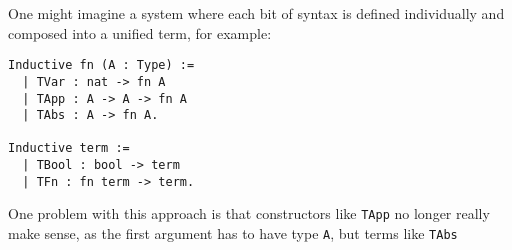 One might imagine a system where each bit of syntax is defined individually and composed into a unified term, for example:

\begin{verbatim}
Inductive fn (A : Type) :=
  | TVar : nat -> fn A
  | TApp : A -> A -> fn A
  | TAbs : A -> fn A.

Inductive term :=
  | TBool : bool -> term
  | TFn : fn term -> term.
\end{verbatim}

One problem with this approach is that constructors like \texttt{TApp} no longer really make sense, as the first argument has to have type \texttt{A}, but terms like \texttt{TAbs }